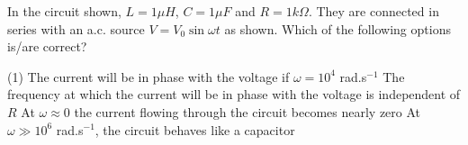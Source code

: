     \item In the circuit shown, \( L = 1 \mu H \), \( C = 1 \mu F \) and \( R = 1 k\Omega \). They are connected in series with an a.c. source \( V = V_0 \sin \omega t \) as shown. Which of the following options is/are correct?
    \begin{center}
    \end{center}
        \begin{tasks}(1)
            \task The current will be in phase with the voltage if \( \omega = 10^4 \) rad.s\(^{-1}\)
            \task The frequency at which the current will be in phase with the voltage is independent of \( R \)
            \task At \( \omega \approx 0 \) the current flowing through the circuit becomes nearly zero
            \task At \( \omega \gg 10^6 \) rad.s\(^{-1}\), the circuit behaves like a capacitor
        \end{tasks}
    